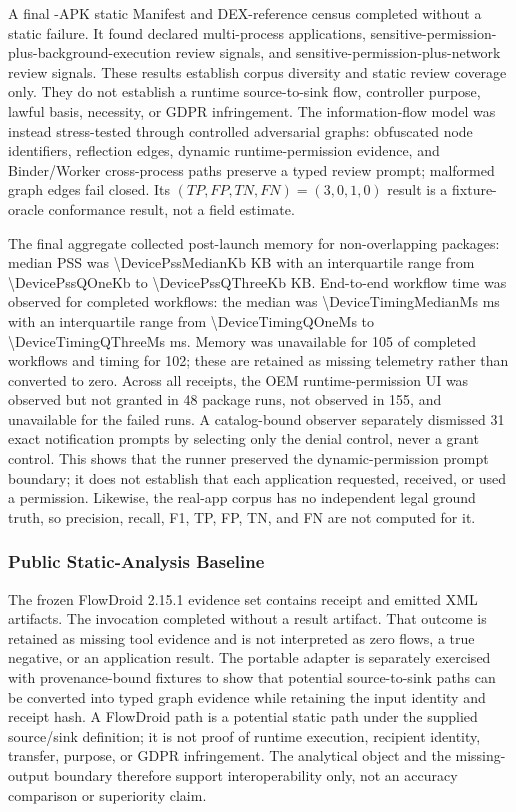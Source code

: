 A final \FDroidCensusN{}-APK static Manifest and DEX-reference census completed without a static failure. It found \FDroidMultiProcessN{} declared multi-process applications, \FDroidSensitiveBackgroundN{} sensitive-permission-plus-background-execution review signals, and \FDroidSensitiveNetworkN{} sensitive-permission-plus-network review signals. These results establish corpus diversity and static review coverage only. They do not establish a runtime source-to-sink flow, controller purpose, lawful basis, necessity, or GDPR infringement. The information-flow model was instead stress-tested through controlled adversarial graphs: obfuscated node identifiers, reflection edges, dynamic runtime-permission evidence, and Binder/Worker cross-process paths preserve a typed review prompt; malformed graph edges fail closed. Its $(TP,FP,TN,FN)=(3,0,1,0)$ result is a fixture-oracle conformance result, not a field estimate.

The final aggregate collected post-launch memory for \PssObservedN{} non-overlapping packages: median PSS was \num{\DevicePssMedianKb} KB with an interquartile range from \num{\DevicePssQOneKb} to \num{\DevicePssQThreeKb} KB. End-to-end workflow time was observed for \TimingObservedN{} completed workflows: the median was \num{\DeviceTimingMedianMs} ms with an interquartile range from \num{\DeviceTimingQOneMs} to \num{\DeviceTimingQThreeMs} ms. Memory was unavailable for 105 of \CompletedWorkflowsN{} completed workflows and timing for 102; these are retained as missing telemetry rather than converted to zero. Across all receipts, the OEM runtime-permission UI was observed but not granted in 48 package runs, not observed in 155, and unavailable for the \FailedDeviceWorkflowsN{} failed runs. A catalog-bound observer separately dismissed 31 exact notification prompts by selecting only the denial control, never a grant control. This shows that the runner preserved the dynamic-permission prompt boundary; it does not establish that each application requested, received, or used a permission. Likewise, the real-app corpus has no independent legal ground truth, so precision, recall, F1, TP, FP, TN, and FN are not computed for it.

\subsubsection{Public Static-Analysis Baseline}

The frozen FlowDroid 2.15.1 evidence set contains \FlowDroidReceiptsN{} receipt and \FlowDroidXmlArtifactsN{} emitted XML artifacts. The invocation completed without a result artifact. That outcome is retained as missing tool evidence and is not interpreted as zero flows, a true negative, or an application result. The portable adapter is separately exercised with provenance-bound fixtures to show that potential source-to-sink paths can be converted into typed graph evidence while retaining the input identity and receipt hash. A FlowDroid path is a potential static path under the supplied source/sink definition; it is not proof of runtime execution, recipient identity, transfer, purpose, or GDPR infringement. The analytical object and the missing-output boundary therefore support interoperability only, not an accuracy comparison or superiority claim.


